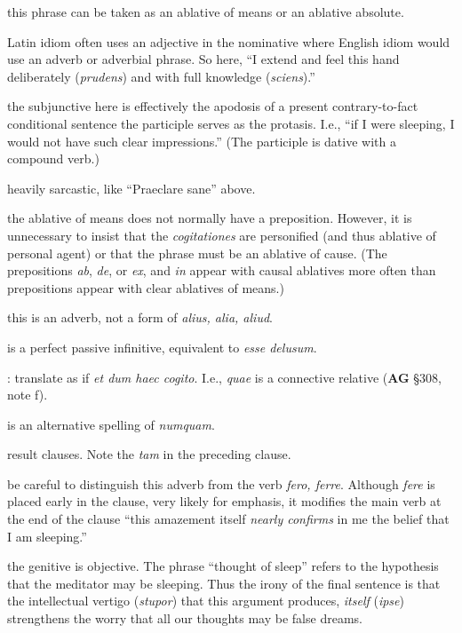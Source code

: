  this phrase can be taken as an ablative of means or an ablative absolute.

 Latin idiom often uses an adjective in the nominative where English idiom would use an adverb or adverbial phrase. So here, ``I extend and feel this hand deliberately (\textit{prudens}) and with full knowledge (\textit{sciens}).''

 the subjunctive here is effectively the apodosis of a present contrary-to-fact conditional sentence the participle serves as the protasis. I.e., ``if I were sleeping, I would not have such clear impressions.'' (The participle is dative with a compound verb.) 

 heavily sarcastic, like ``Praeclare sane'' above.

 the ablative of means does not normally have a preposition. However, it is unnecessary to insist that the \textit{cogitationes} are personified (and thus ablative of personal agent) or that the phrase must be an ablative of cause. (The prepositions \textit{ab}, \textit{de}, or \textit{ex}, and \textit{in} appear with causal ablatives more often than prepositions appear with clear ablatives of means.)

 this is an adverb, not a form of \textit{alius, alia, aliud}.

 is a perfect passive infinitive, equivalent to \textit{esse delusum}.

: translate as if \textit{et dum haec cogito}. I.e., \textit{quae} is a connective relative (\textbf{AG} §308, note f).

 is an alternative spelling of \textit{numquam}.

 result clauses. Note the \textit{tam} in the preceding clause.

 be careful to distinguish this adverb from the verb \textit{fero, ferre}. Although \textit{fere} is placed early in the clause, very likely for emphasis, it modifies the main verb at the end of the clause ``this amazement itself \textit{nearly confirms} in me the belief that I am sleeping.''

 the genitive is objective. The phrase ``thought of sleep'' refers to the hypothesis that the meditator may be sleeping. Thus the irony of the final sentence is that the intellectual vertigo (\textit{stupor}) that this argument produces, \textit{itself} (\textit{ipse}) strengthens the worry that all our thoughts may be false dreams.

